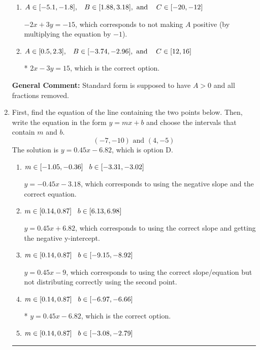 \documentclass{extbook}[14pt]
\newcommand{\litem}[1]{\item #1

\rule{\textwidth}{0.4pt}}
\begin{document}
\begin{enumerate}
{\begin{enumerate}[label=\Alph*.]
 $2x + 3y = -15$, which corresponds to using the opposite (negative) slope of the graph, but did everything else correctly.
\item \( A \in [-5.1, -1.8], \hspace{3mm} B \in [1.88, 3.18], \text{ and } \hspace{3mm} C \in [-20, -12] \)

 $-2x + 3y = -15$, which corresponds to not making $A$ positive (by multiplying the equation by $-1$).
\item \( A \in [0.5, 2.3], \hspace{3mm} B \in [-3.74, -2.96], \text{ and } \hspace{3mm} C \in [12, 16] \)

* $2x - 3y = 15$, which is the correct option.
\end{enumerate}

\textbf{General Comment:} Standard form is supposed to have $A > 0$ and all fractions removed.
}
\litem{
First, find the equation of the line containing the two points below. Then, write the equation in the form $ y=mx+b $ and choose the intervals that contain $m$ and $b$.
\[ (-7, -10) \text{ and } (4, -5) \]The solution is \( y = 0.45x -6.82 \), which is option D.\begin{enumerate}[label=\Alph*.]
\item \( m \in [-1.05, -0.36] \hspace*{3mm} b \in [-3.31, -3.02] \)

 $y = -0.45x -3.18$, which corresponds to using the negative slope and the correct equation.
\item \( m \in [0.14, 0.87] \hspace*{3mm} b \in [6.13, 6.98] \)

 $y = 0.45x + 6.82$, which corresponds to using the correct slope and getting the negative y-intercept.
\item \( m \in [0.14, 0.87] \hspace*{3mm} b \in [-9.15, -8.92] \)

 $y = 0.45x -9$, which corresponds to using the correct slope/equation but not distributing correctly using the second point.
\item \( m \in [0.14, 0.87] \hspace*{3mm} b \in [-6.97, -6.66] \)

* $y = 0.45x -6.82$, which is the correct option.
\item \( m \in [0.14, 0.87] \hspace*{3mm} b \in [-3.08, -2.79] \)


\end{enumerate}}
\end{enumerate}
\end{document}
